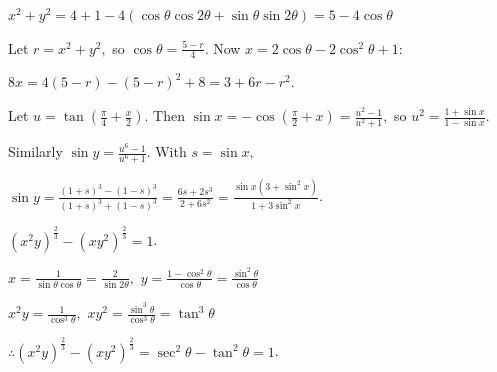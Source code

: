   $x^2 + y^2 = 4 + 1 - 4(\cos\theta\cos2\theta + \sin\theta\sin2\theta) = 5 - 4\cos\theta$

  Let $r = x^2 + y^2,$ so $\cos\theta = \frac{5 - r}{4}$. Now $x = 2\cos\theta - 2\cos^2\theta + 1$:

  $8x = 4(5 - r) - (5 - r)^2 + 8 = 3 + 6r - r^2$.

\item Let $u = \tan\left(\frac{\pi}{4} + \frac{x}{2}\right)$. Then $\sin x = -\cos\left(\frac{\pi}{2} + x\right) = \frac{u^2 -
  1}{u^2 + 1},$ so $u^2 = \frac{1 + \sin x}{1 - \sin x}$.

  Similarly $\sin y = \frac{u^6 - 1}{u^6 + 1}$. With $s = \sin x,$

  $\sin y = \frac{(1 + s)^3 - (1 - s)^3}{(1 + s)^3 + (1 - s)^3} = \frac{6s + 2s^3}{2 + 6s^2} = \frac{\sin x(3 + \sin^2x)}{1 +
  3\sin^2x}$.

\item $(x^2y)^{\frac{2}{3}} - (xy^2)^{\frac{2}{3}} = 1$.

  $x = \frac{1}{\sin\theta\cos\theta} = \frac{2}{\sin2\theta},$ $y = \frac{1 - \cos^2\theta}{\cos\theta} = \frac{\sin^2\theta}{\cos\theta}$

  $x^2y = \frac{1}{\cos^3\theta},$ $xy^2 = \frac{\sin^3\theta}{\cos^3\theta} = \tan^3\theta$

  $\therefore (x^2y)^{\frac{2}{3}} - (xy^2)^{\frac{2}{3}} = \sec^2\theta - \tan^2\theta = 1$.
\stopitemize
